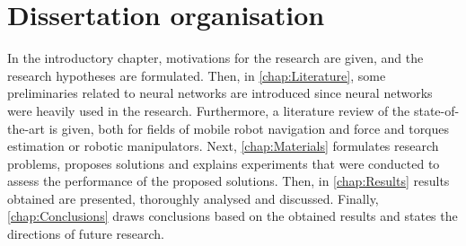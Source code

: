 \section{Dissertation organisation}

In the introductory chapter, motivations for the research are given, and the research hypotheses are formulated. Then, in \cref{chap:Literature}, some preliminaries related to neural networks are introduced since neural networks were heavily used in the research. Furthermore, a literature review of the state-of-the-art is given, both for fields of mobile robot navigation and force and torques estimation or robotic manipulators. Next, \cref{chap:Materials} formulates research problems, proposes solutions and explains experiments that were conducted to assess the performance of the proposed solutions. Then, in \cref{chap:Results} results obtained are presented, thoroughly analysed and discussed. Finally, \cref{chap:Conclusions} draws conclusions based on the obtained results and states the directions of future research.

\newpage